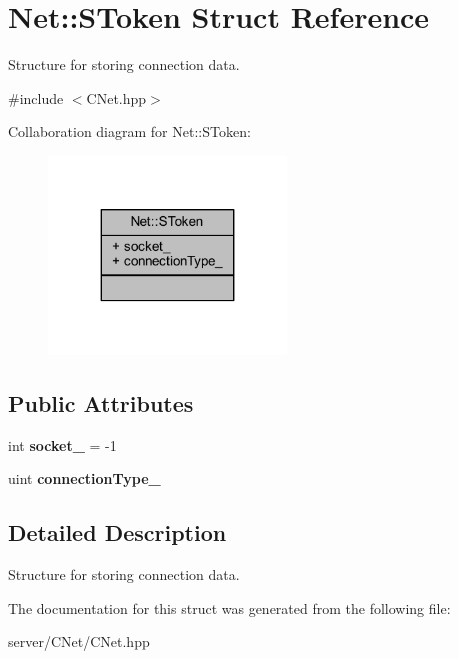 \hypertarget{struct_net_1_1_s_token}{}\section{Net\+:\+:S\+Token Struct Reference}
\label{struct_net_1_1_s_token}


Structure for storing connection data.  




{\ttfamily \#include $<$C\+Net.\+hpp$>$}



Collaboration diagram for Net\+:\+:S\+Token\+:
\nopagebreak
\begin{figure}[H]
\begin{center}
\leavevmode
\includegraphics[width=179pt]{struct_net_1_1_s_token__coll__graph}
\end{center}
\end{figure}
\subsection*{Public Attributes}
\begin{DoxyCompactItemize}
\item 
\mbox{\label{struct_net_1_1_s_token_aeecb14eb3dc790701699198cfa876916}} 
int {\bfseries socket\+\_\+} = -\/1
\item 
\mbox{\label{struct_net_1_1_s_token_aa5a4724ed963dd892e3276ac0a52518e}} 
uint {\bfseries connection\+Type\+\_\+}
\end{DoxyCompactItemize}


\subsection{Detailed Description}
Structure for storing connection data. 

The documentation for this struct was generated from the following file\+:\begin{DoxyCompactItemize}
\item 
server/\+C\+Net/C\+Net.\+hpp\end{DoxyCompactItemize}
